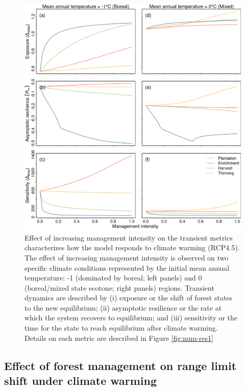 \hypertarget{fig:num-res2}{%
\begin{figure}
\centering
\includegraphics{manuscript/img/num-result_2.png}
\caption[{Effect of increasing management intensity on the transient
metrics characterizing how the model responds to climate warming
(RCP4.5)}]{Effect of increasing management intensity on the transient
metrics characterizes how the model responds to climate warming
(RCP4.5). The effect of increasing management intensity is observed on
two specific climate conditions represented by the initial mean annual
temperature: -1 (dominated by boreal; left panels) and 0 (boreal/mixed
state ecotone; right panels) regions. Transient dynamics are described
by (i) exposure or the shift of forest states to the new equilibrium;
(ii) asymptotic resilience or the rate at which the system recovers to
equilibrium; and (iii) sensitivity or the time for the state to reach
equilibrium after climate warming. Details on each metric are described
in Figure \ref{fig:num-res1}}
\label{fig:num-res2}
\end{figure}
}

\hypertarget{effect-of-forest-management-on-range-limit-shift-under-climate-warming}{%
\subsection{Effect of forest management on range limit shift under
climate
warming}\label{effect-of-forest-management-on-range-limit-shift-under-climate-warming}}

